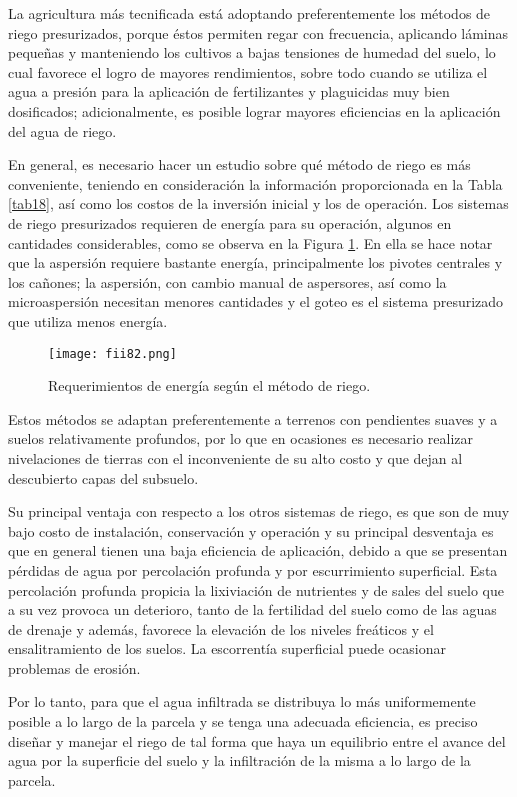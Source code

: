 La agricultura más tecnificada está adoptando preferentemente los métodos de
riego presurizados, porque éstos permiten regar con frecuencia, aplicando láminas
pequeñas y manteniendo los cultivos a bajas tensiones de humedad del suelo, lo cual
favorece el logro de mayores rendimientos, sobre todo cuando se utiliza el agua a
presión para la aplicación de fertilizantes y plaguicidas muy bien dosificados;
adicionalmente, es posible lograr mayores eficiencias en la aplicación del agua de riego.

En general, es necesario hacer un estudio sobre qué método de riego es más
conveniente, teniendo en consideración la información proporcionada en la Tabla \ref{tab18},
así como los costos de la inversión inicial y los de operación. Los sistemas de riego
presurizados requieren de energía para su operación, algunos en cantidades
considerables, como se observa en la Figura \ref{fii82}. En ella se hace notar que la aspersión
requiere bastante energía, principalmente los pivotes centrales y los cañones; la
aspersión, con cambio manual de aspersores, así como la microaspersión necesitan
menores cantidades y el goteo es el sistema presurizado que utiliza menos energía.

\begin{figure}[h!]
	\centerline{\texttt{[image: fii82.png]}}
	\caption{Requerimientos de energía según el método de riego.}
	\label{fii82}
\end{figure}


Estos métodos se adaptan preferentemente a terrenos con pendientes suaves y
a suelos relativamente profundos, por lo que en ocasiones es necesario realizar
nivelaciones de tierras con el inconveniente de su alto costo y que dejan al descubierto
capas del subsuelo.

Su principal ventaja con respecto a los otros sistemas de riego, es que son de
muy bajo costo de instalación, conservación y operación y su principal desventaja es
que en general tienen una baja eficiencia de aplicación, debido a que se presentan
pérdidas de agua por percolación profunda y por escurrimiento superficial. Esta
percolación profunda propicia la lixiviación de nutrientes y de sales del suelo que a su
vez provoca un deterioro, tanto de la fertilidad del suelo como de las aguas de drenaje y
además, favorece la elevación de los niveles freáticos y el ensalitramiento de los suelos.
La escorrentía superficial puede ocasionar problemas de erosión.

Por lo tanto, para que el agua infiltrada se distribuya lo más uniformemente
posible a lo largo de la parcela y se tenga una adecuada eficiencia, es preciso diseñar y
manejar el riego de tal forma que haya un equilibrio entre el avance del agua por la
superficie del suelo y la infiltración de la misma a lo largo de la parcela.

